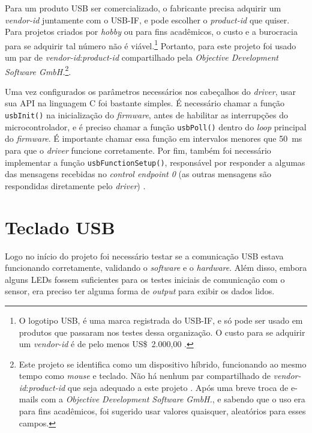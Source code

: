 \documentclass[brazil,pagestart=firstchapter]{abnt}
\begin{document}
Para um produto \ac{USB} ser comercializado, o fabricante precisa adquirir
um \textit{vendor-id} juntamente com o \ac{USB-IF}, e pode escolher o
\textit{product-id} que quiser. Para projetos criados por \textit{hobby} ou
para fins acadêmicos, o custo e a burocracia para se adquirir tal número não
é viável.\footnote{
	O logotipo USB, é uma marca registrada do \ac{USB-IF}, e só pode ser
	usado em produtos que passaram nos testes dessa organização.
	\cite{USBlogo} O custo para se adquirir um \textit{vendor-id} é de
	pelo menos US\$~2.000,00 \cite{USBvendor}.
}
Portanto, para este projeto foi usado um par de
\textit{vendor-id}:\textit{product-id} compartilhado pela \textit{Objective
Development Software GmbH.}\footnote{
	Este projeto se identifica como um dispositivo híbrido, funcionando ao
	mesmo tempo como \textit{mouse} e teclado. Não há nenhum par
	compartilhado de \textit{vendor-id}:\textit{product-id} que seja
	adequado a este projeto \cite{VUSBdriver}. Após
	uma breve troca de e-mails com a \textit{Objective Development Software
	GmbH.}, e sabendo que o uso era para fins acadêmicos, foi sugerido usar
	valores quaisquer, aleatórios para esses campos.
}.

Uma vez configurados os parâmetros necessários nos cabeçalhos do
\textit{driver}, usar sua \ac{API} na linguagem C foi bastante simples. É
necessário chamar a função \texttt{usbInit()} na inicialização do
\textit{firmware}, antes de habilitar as interrupções do microcontrolador, e
é preciso chamar a função \texttt{usbPoll()} dentro do \textit{loop}
principal do \textit{firmware}. É importante chamar essa função em
intervalos menores que \SI{50}{\milli\second} para que o \textit{driver}
funcione corretamente. Por fim, também foi necessário implementar a função
\texttt{usbFunctionSetup()}, responsável por responder a algumas das
mensagens recebidas no \textit{control endpoint 0} (as outras mensagens são
respondidas diretamente pelo \textit{driver}) \cite{WikiDotDriverApi}.


\section{Teclado USB}
\label{sec:keyboard}

Logo no início do projeto foi necessário testar se a comunicação \ac{USB}
estava funcionando corretamente, validando o \textit{software} e o
\textit{hardware}. Além disso, embora alguns \acp{LED} fossem suficientes
para os testes iniciais de comunicação com o sensor, era preciso ter alguma
forma de \textit{output} para exibir os dados lidos.
\end{document}
